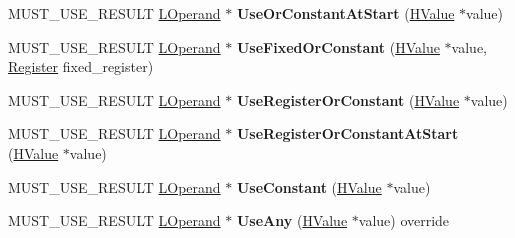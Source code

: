 \begin{DoxyCompactItemize}
\item 
M\+U\+S\+T\+\_\+\+U\+S\+E\+\_\+\+R\+E\+S\+U\+LT \hyperlink{classv8_1_1internal_1_1_l_operand}{L\+Operand} $\ast$ {\bfseries Use\+Or\+Constant\+At\+Start} (\hyperlink{classv8_1_1internal_1_1_h_value}{H\+Value} $\ast$value)\hypertarget{classv8_1_1internal_1_1_l_chunk_builder_a5338ef34c47b58207b22fd5a66807f85}{}\label{classv8_1_1internal_1_1_l_chunk_builder_a5338ef34c47b58207b22fd5a66807f85}

\item 
M\+U\+S\+T\+\_\+\+U\+S\+E\+\_\+\+R\+E\+S\+U\+LT \hyperlink{classv8_1_1internal_1_1_l_operand}{L\+Operand} $\ast$ {\bfseries Use\+Fixed\+Or\+Constant} (\hyperlink{classv8_1_1internal_1_1_h_value}{H\+Value} $\ast$value, \hyperlink{structv8_1_1internal_1_1_register}{Register} fixed\+\_\+register)\hypertarget{classv8_1_1internal_1_1_l_chunk_builder_a3336afc28a8e888472171b1bda7a4c6c}{}\label{classv8_1_1internal_1_1_l_chunk_builder_a3336afc28a8e888472171b1bda7a4c6c}

\item 
M\+U\+S\+T\+\_\+\+U\+S\+E\+\_\+\+R\+E\+S\+U\+LT \hyperlink{classv8_1_1internal_1_1_l_operand}{L\+Operand} $\ast$ {\bfseries Use\+Register\+Or\+Constant} (\hyperlink{classv8_1_1internal_1_1_h_value}{H\+Value} $\ast$value)\hypertarget{classv8_1_1internal_1_1_l_chunk_builder_aace121601a2caa8e6684cc5d5963f0df}{}\label{classv8_1_1internal_1_1_l_chunk_builder_aace121601a2caa8e6684cc5d5963f0df}

\item 
M\+U\+S\+T\+\_\+\+U\+S\+E\+\_\+\+R\+E\+S\+U\+LT \hyperlink{classv8_1_1internal_1_1_l_operand}{L\+Operand} $\ast$ {\bfseries Use\+Register\+Or\+Constant\+At\+Start} (\hyperlink{classv8_1_1internal_1_1_h_value}{H\+Value} $\ast$value)\hypertarget{classv8_1_1internal_1_1_l_chunk_builder_a14ca10ac408e3ec8501d2875ddf606fc}{}\label{classv8_1_1internal_1_1_l_chunk_builder_a14ca10ac408e3ec8501d2875ddf606fc}

\item 
M\+U\+S\+T\+\_\+\+U\+S\+E\+\_\+\+R\+E\+S\+U\+LT \hyperlink{classv8_1_1internal_1_1_l_operand}{L\+Operand} $\ast$ {\bfseries Use\+Constant} (\hyperlink{classv8_1_1internal_1_1_h_value}{H\+Value} $\ast$value)\hypertarget{classv8_1_1internal_1_1_l_chunk_builder_a6985436610071c802b9a670ae3f60700}{}\label{classv8_1_1internal_1_1_l_chunk_builder_a6985436610071c802b9a670ae3f60700}

\item 
M\+U\+S\+T\+\_\+\+U\+S\+E\+\_\+\+R\+E\+S\+U\+LT \hyperlink{classv8_1_1internal_1_1_l_operand}{L\+Operand} $\ast$ {\bfseries Use\+Any} (\hyperlink{classv8_1_1internal_1_1_h_value}{H\+Value} $\ast$value) override\hypertarget{classv8_1_1internal_1_1_l_chunk_builder_a61cb5c69ba1d82ff575d5d84ff6d1721}{}\label{classv8_1_1internal_1_1_l_chunk_builder_a61cb5c69ba1d82ff575d5d84ff6d1721}


\end{DoxyCompactItemize}
